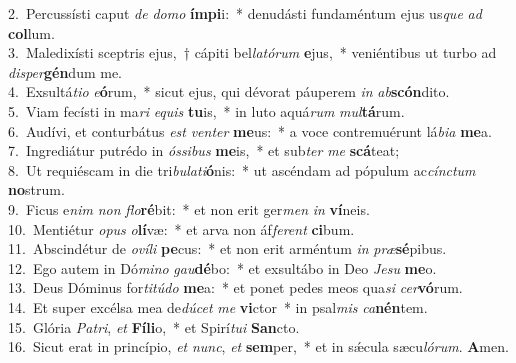 {2.~}Percussísti caput \textit{de} \textit{do}\textit{mo} \textbf{ím}\textbf{pi}i:~* denudásti fundaméntum ejus us\textit{que} \textit{ad} \textbf{col}lum.\\
{3.~}Maledixísti sceptris ejus,~† cápiti bel\textit{la}\textit{tó}\textit{rum} \textbf{e}jus,~* veniéntibus ut turbo ad \textit{di}\textit{sper}\textbf{gén}dum me.\\
{4.~}Exsultá\textit{ti}\textit{o} \textit{e}\textbf{ó}rum,~* sicut ejus, qui dévorat páuperem \textit{in} \textit{ab}\textbf{scón}dito.\\
{5.~}Viam fecísti in ma\textit{ri} \textit{e}\textit{quis} \textbf{tu}is,~* in luto aquá\textit{rum} \textit{mul}\textbf{tá}rum.\\
{6.~}Audívi, et conturbátus \textit{est} \textit{ven}\textit{ter} \textbf{me}us:~* a voce contremuérunt lá\textit{bi}\textit{a} \textbf{me}a.\\
{7.~}Ingrediátur putrédo in \textit{ós}\textit{si}\textit{bus} \textbf{me}is,~* et sub\textit{ter} \textit{me} \textbf{scá}teat;\\
{8.~}Ut requiéscam in die tri\textit{bu}\textit{la}\textit{ti}\textbf{ó}nis:~* ut ascéndam ad pópulum ac\textit{cín}\textit{ctum} \textbf{no}strum.\\
{9.~}Ficus e\textit{nim} \textit{non} \textit{flo}\textbf{ré}bit:~* et non erit ger\textit{men} \textit{in} \textbf{ví}neis.\\
{10.~}Mentiétur \textit{o}\textit{pus} \textit{o}\textbf{lí}væ:~* et arva non áf\textit{fe}\textit{rent} \textbf{ci}bum.\\
{11.~}Abscindétur de \textit{o}\textit{ví}\textit{li} \textbf{pe}cus:~* et non erit arméntum \textit{in} \textit{præ}\textbf{sé}pibus.\\
{12.~}Ego autem in Dó\textit{mi}\textit{no} \textit{gau}\textbf{dé}bo:~* et exsultábo in Deo \textit{Je}\textit{su} \textbf{me}o.\\
{13.~}Deus Dóminus for\textit{ti}\textit{tú}\textit{do} \textbf{me}a:~* et ponet pedes meos qua\textit{si} \textit{cer}\textbf{vó}rum.\\
{14.~}Et super excélsa mea de\textit{dú}\textit{cet} \textit{me} \textbf{vi}ctor~* in psal\textit{mis} \textit{ca}\textbf{nén}tem.\\
{15.~}Glória \textit{Pa}\textit{tri}, \textit{et} \textbf{Fí}\textbf{li}o,~* et Spirí\textit{tu}\textit{i} \textbf{San}cto.\\
{16.~}Sicut erat in princípio, \textit{et} \textit{nunc}, \textit{et} \textbf{sem}per,~* et in sǽcula sæcu\textit{ló}\textit{rum}. \textbf{A}men.\\
